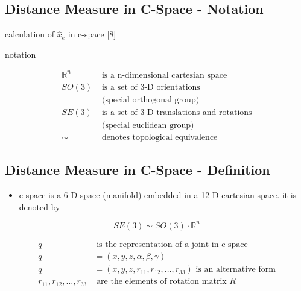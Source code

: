 \documentclass[%
  professionalfonts,%
  xcolor={%
    usenames,%
    dvipsnames,%
    svgnames,%
    table,%
    hyperref%
  }%
]{beamer}
\begin{document}
\subsection{Distance Measure in C-Space - Notation}
\begin{frame}
calculation of $\hat{x}_{e}$ in c-space [8]

notation

\begin{align*}
\mathbb{R}^{n} & \text{ is a n-dimensional cartesian space} \\
SO(3) & \text{ is a set of 3-D orientations} \\
& \text{ (special orthogonal group)} \\
SE(3) & \text{ is a set of 3-D translations and rotations} \\
& \text{ (special euclidean group)} \\
\sim & \text{ denotes topological equivalence}
\end{align*}

\end{frame}

\subsection{Distance Measure in C-Space - Definition}
\begin{frame}
	
\begin{itemize}
\item c-space is a 6-D space (manifold) embedded in a 12-D cartesian space. it is denoted by
\end{itemize}

\begin{equation*}
	SE(3) \sim SO(3) \cdot \mathbb{R}^{n} \label{eq:seso}
\end{equation*}

\begin{align*}
q & \text{ is the representation of a joint in c-space} \\
q & = (x,y,z,\alpha,\beta,\gamma) \\
q & = (x,y,z,r_{11},r_{12},\dotsc,r_{33}) \text{ is an alternative form} \\
r_{11},r_{12},\dotsc,r_{33} & \text{ are the elements of rotation matrix } R \\
\end{align*}

\end{frame}
\end{document}
